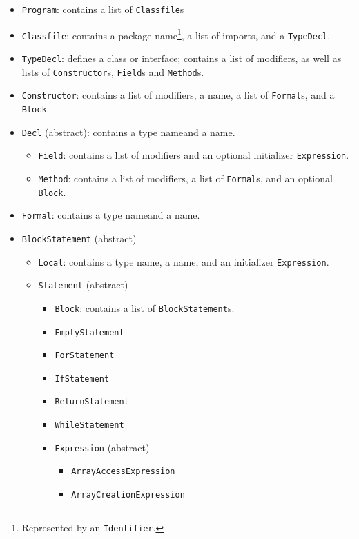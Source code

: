 \documentclass[12pt]{article}
\newcommand{\code}[1]{\texttt{#1}}
\begin{document}
\begin{itemize}
\item \code{Program}: contains a list of \code{Classfile}s
\item \code{Classfile}: contains a package name\footnote{Represented by an \code{Identifier}.}, a list of imports\footnotemark[\value{footnote}], and a \code{TypeDecl}.
\item \code{TypeDecl}: defines a class or interface; contains a list of modifiers, as well as lists of \code{Constructor}s, \code{Field}s and \code{Method}s.
\item \code{Constructor}: contains a list of modifiers, a name\footnotemark[\value{footnote}], a list of \code{Formal}s, and a \code{Block}.
\item \code{Decl} (abstract): contains a type name\footnotemark[\value{footnote}] and a name\footnotemark[\value{footnote}].
\begin{itemize}
\item \code{Field}: contains a list of modifiers and an optional initializer \code{Expression}.
\item \code{Method}: contains a list of modifiers, a list of \code{Formal}s, and an optional \code{Block}.
\end{itemize}
\item \code{Formal}: contains a type name\footnotemark[\value{footnote}] and a name\footnotemark[\value{footnote}].
\item \code{BlockStatement} (abstract)
\begin{itemize}
\item \code{Local}: contains a type name\footnotemark[\value{footnote}], a name\footnotemark[\value{footnote}], and an initializer \code{Expression}.
\item \code{Statement} (abstract)
\begin{itemize}
\item \code{Block}: contains a list of \code{BlockStatement}s.
\item \code{EmptyStatement}
\item \code{ForStatement}
\item \code{IfStatement}
\item \code{ReturnStatement}
\item \code{WhileStatement}
\item \code{Expression} (abstract)
\begin{itemize}
\item \code{ArrayAccessExpression}
\item \code{ArrayCreationExpression}

\end{itemize}
\end{itemize}
\end{itemize}
\end{itemize}
\end{document}
